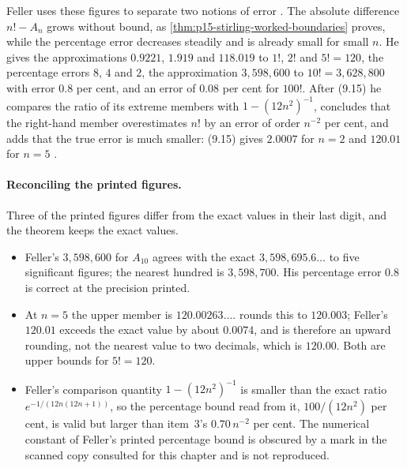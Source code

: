 Feller uses these figures to separate two notions of error
\cite[p.~52]{Feller1968ProbabilityI}. The absolute difference
\(n!-A_n\) grows without bound, as
\cref{thm:p15-stirling-worked-boundaries} proves, while the percentage error
decreases steadily and is already small for small \(n\). He gives the
approximations \(0.9221\), \(1.919\) and \(118.019\) to \(1!\), \(2!\) and
\(5!=120\), the percentage errors \(8\), \(4\) and \(2\), the approximation
\(3{,}598{,}600\) to \(10!=3{,}628{,}800\) with error \(0.8\) per cent, and
an error of \(0.08\) per cent for \(100!\). After (9.15) he compares the
ratio of its extreme members with \(1-(12n^2)^{-1}\), concludes that the
right-hand member overestimates \(n!\) by an error of order \(n^{-2}\) per
cent, and adds that the true error is much smaller: (9.15) gives
\(2.0007\) for \(n=2\) and \(120.01\) for \(n=5\)
\cite[p.~54]{Feller1968ProbabilityI}.

\paragraph{Reconciling the printed figures.}
Three of the printed figures differ from the exact values in their last
digit, and the theorem keeps the exact values.
\begin{itemize}
\item Feller's \(3{,}598{,}600\) for \(A_{10}\) agrees with the exact
      \(3{,}598{,}695.6\ldots\) to five significant figures; the nearest
      hundred is \(3{,}598{,}700\). His percentage error \(0.8\) is correct
      at the precision printed.
\item At \(n=5\) the upper member is \(120.00263\ldots\).
       rounds this to \(120.003\);
      Feller's \(120.01\) exceeds the exact value by about \(0.0074\), and is
      therefore an upward rounding, not the nearest value to two decimals,
      which is \(120.00\). Both are upper bounds for \(5!=120\).
\item Feller's comparison quantity \(1-(12n^2)^{-1}\) is smaller than the
      exact ratio \(e^{-1/(12n(12n+1))}\), so the percentage bound read from
      it, \(100/(12n^2)\) per cent, is valid but larger than item~3's
      \(0.70\,n^{-2}\) per cent. The numerical constant of Feller's printed
      percentage bound is obscured by a mark in the scanned copy consulted
      for this chapter and is not reproduced.
\end{itemize}

